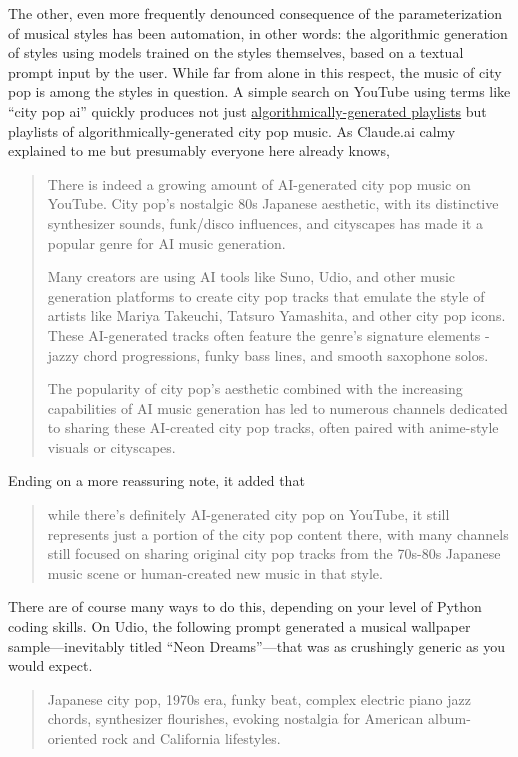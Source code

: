 \documentclass[
  letterpaper,
  DIV=11,
  numbers=noendperiod,
  oneside]{scrartcl}
\begin{document}
The other, even more frequently denounced consequence of the
parameterization of musical styles has been automation, in other words:
the algorithmic generation of styles using models trained on the styles
themselves, based on a textual prompt input by the user. While far from
alone in this respect, the music of city pop is among the styles in
question. A simple search on YouTube using terms like ``city pop ai''
quickly produces not just
\href{https://youtu.be/EaK5AQ_fnS0?si=M-9LSJysAZjHBAbu}{algorithmically-generated
playlists} but playlists of algorithmically-generated city pop music. As
Claude.ai calmy explained to me but presumably everyone here already
knows,

\begin{quote}
There is indeed a growing amount of AI-generated city pop music on
YouTube. City pop's nostalgic 80s Japanese aesthetic, with its
distinctive synthesizer sounds, funk/disco influences, and cityscapes
has made it a popular genre for AI music generation.

Many creators are using AI tools like Suno, Udio, and other music
generation platforms to create city pop tracks that emulate the style of
artists like Mariya Takeuchi, Tatsuro Yamashita, and other city pop
icons. These AI-generated tracks often feature the genre's signature
elements - jazzy chord progressions, funky bass lines, and smooth
saxophone solos.

The popularity of city pop's aesthetic combined with the increasing
capabilities of AI music generation has led to numerous channels
dedicated to sharing these AI-created city pop tracks, often paired with
anime-style visuals or cityscapes.
\end{quote}

Ending on a more reassuring note, it added that

\begin{quote}
while there's definitely AI-generated city pop on YouTube, it still
represents just a portion of the city pop content there, with many
channels still focused on sharing original city pop tracks from the
70s-80s Japanese music scene or human-created new music in that style.
\end{quote}

There are of course many ways to do this, depending on your level of
Python coding skills. On Udio, the following prompt generated a musical
wallpaper sample---inevitably titled ``Neon Dreams''---that was as
crushingly generic as you would expect.

\begin{quote}
Japanese city pop, 1970s era, funky beat, complex electric piano jazz
chords, synthesizer flourishes, evoking nostalgia for American
album-oriented rock and California lifestyles.
\end{quote}
\end{document}
